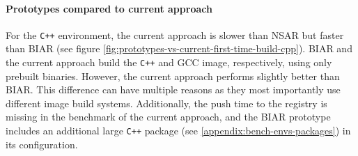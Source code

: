 \paragraph{Prototypes compared to current approach}\label{prototypes-vs-current-first-time-build}
For the \verb|C++| environment, the current approach is slower than NSAR but faster than BIAR (see figure \ref{fig:prototypes-vs-current-first-time-build-cpp}). BIAR and the current approach build the \verb|C++| and GCC image, respectively, using only prebuilt binaries. However, the current approach performs slightly better than BIAR. This difference can have multiple reasons as they most importantly use different image build systems. Additionally, the push time to the registry is missing in the benchmark of the current approach, and the BIAR prototype includes an additional large \verb|C++| package (see \ref{appendix:bench-envs-packages}) in its configuration.

